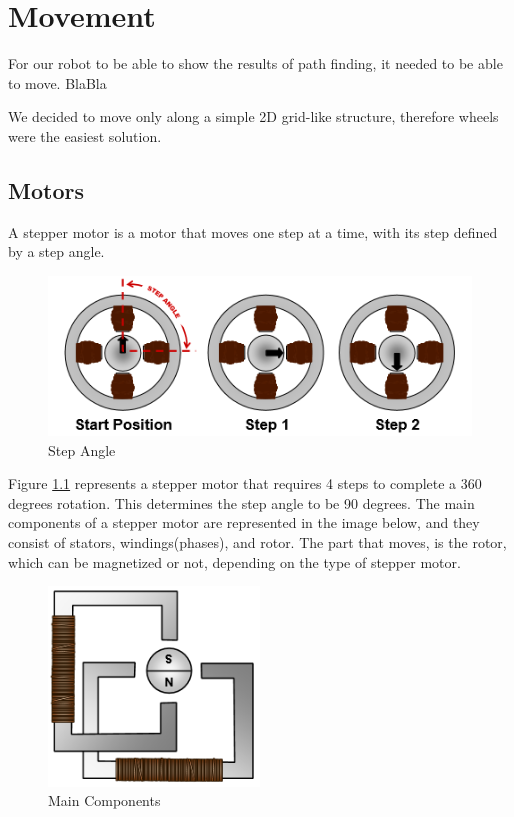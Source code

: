\chapter{Movement}\label{ch:move}
For our robot to be able to show the results of path finding,
it needed to be able to move. BlaBla

We decided to move only along a simple 2D grid-like structure,
therefore wheels were the easiest solution.

\section{Motors}\label{sec:motors}
A stepper motor is a motor that moves one step at a time, with its step defined by a step angle.

\begin{figure}[ht]
	\centering
	\includegraphics[width=\textwidth]{figures/move/motor1.png}
	\caption{Step Angle}
	\label{fig:angle} 
\end{figure}

Figure \ref{fig:angle} represents a stepper motor that requires 4 steps to complete a 360 degrees rotation. This determines the step angle to be 90 degrees.
The main components of a stepper motor are represented in the image below, and they consist of stators, windings(phases), and rotor.
The part that moves, is the rotor, which can be magnetized or not, depending on the type of stepper motor.

\begin{figure}[ht]
	\centering
	\includegraphics[width=0.5\textwidth]{figures/move/motor2.png}
	\caption{Main Components}
\end{figure}


